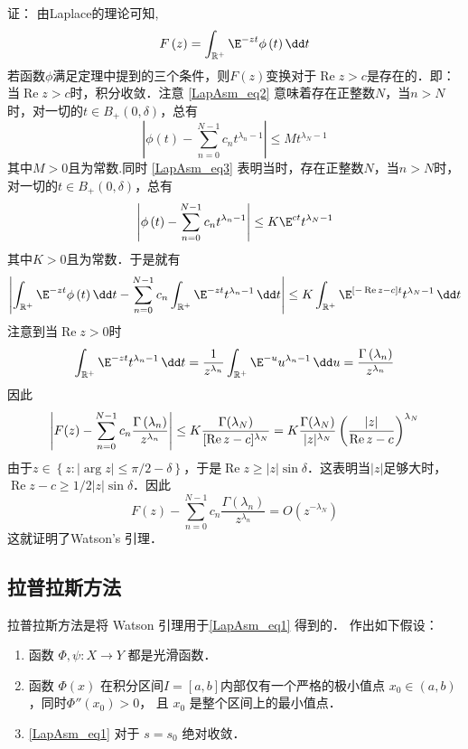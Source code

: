 证：
由Laplace的理论可知, 
\[
F\left(z\right)=\int_{\mathbb{R}^+}{\E^{-zt}\phi\left(t\right)}\,\dd t
\]
若函数$\phi$满足定理中提到的三个条件，则$F(z)$变换对于$\operatorname{Re} z>c$是存在的．即：当$\operatorname{Re} z>c$时，积分收敛．注意 \autoref{LapAsm_eq2} 意味着存在正整数$N$，当$n>N$时，对一切的$t\in B_{+}(0,\delta)$，总有
\[
  \left|\phi\left(t\right)-\sum_{n=0}^{N-1}{c_nt^{\lambda_n-1}}\right|\le Mt^{\lambda_N-1}
\]
其中$M>0$且为常数.同时 \autoref{LapAsm_eq3} 表明当时，存在正整数$N$，当$n>N$时，对一切的$t\in B_{+}(0,\delta)$，总有
\[
\left|\phi\left(t\right)-\sum_{n=0}^{N-1}{c_nt^{\lambda_n-1}}\right|\le K\E^{ct}t^{\lambda_N-1}
\]
其中$K>0$且为常数．于是就有
\[
\left|\int_{\mathbb{R}^+}{\E^{-zt}\phi\left(t\right)}\,\dd t-\sum_{n=0}^{N-1}{c_n\int_{\mathbb{R}^+}{\E^{-zt}t^{\lambda_n-1}}\,\dd t}\right|
\le K\int_{\mathbb{R}^+}\E^{[-\operatorname{Re}z-c]t}t^{\lambda_N-1}\,\dd t
\]
注意到当$\operatorname{Re}z>0$时
\[
\int_{\mathbb{R}^+}{\E^{-zt}t^{\lambda_n-1}}\,\dd t
=\frac{1}{z^{\lambda_n}}\int_{\mathbb{R}^+}{\E^{-u}u^{\lambda_n-1}}\,\dd u
=\frac{\Gamma\left(\lambda_n\right)}{z^{\lambda_n}}
\]
因此
\[
\left|F(z)-\sum_{n=0}^{N-1}{c_n\frac{\Gamma\left(\lambda_n\right)}{z^{\lambda_n}}}\right|\le K {\Gamma(\lambda_{N})\over \operatorname{[Re}z-c]^{\lambda_N}}
=K{\Gamma(\lambda_{N})\over |z|^{\lambda_N}}\left(|z|\over \operatorname{Re}z-c\right)^{\lambda_N}
\]
由于$z\in{\left\{z:\left|\arg{z}\right|\le\pi/2-\delta\right\}}$，于是$\operatorname{Re}z\geq |z|\sin \delta$．这表明当$\left|z\right|$足够大时，$\operatorname{Re}z-c\geqslant1/2|z|\sin \delta$．因此
\[
F\left(z\right)-\sum_{n=0}^{N-1}{c_n\frac{\Gamma\left(\lambda_n\right)}{z^{\lambda_n}}}=O\left(z^{-\lambda_N}\right)
\]
这就证明了Watson's 引理．


\subsection{拉普拉斯方法}
拉普拉斯方法是将 Watson 引理用于\autoref{LapAsm_eq1} 得到的． 作出如下假设：

\begin{enumerate}
\item 函数 $\Phi,\psi:X\to Y$ 都是光滑函数．

\item 函数 $\Phi(x)$ 在积分区间$I=[a,b]$内部仅有一个严格的极小值点 $x_0\in(a,b)$，同时$\Phi''(x_0)>0$， 且 $x_0$ 是整个区间上的最小值点．

\item \autoref{LapAsm_eq1} 对于 $s=s_0$ 绝对收敛．
\end{enumerate}

